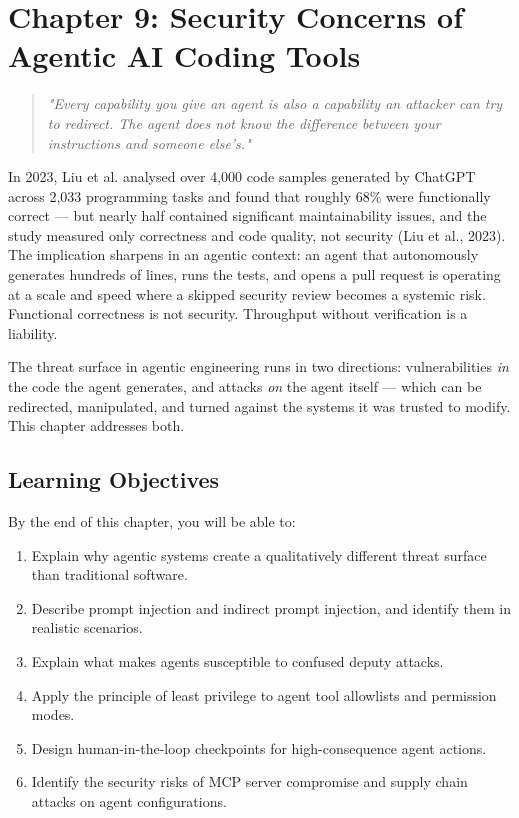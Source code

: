 \documentclass[11pt,a4paper]{book}
\begin{document}
\medskip


\chapter{Chapter 9: Security Concerns of Agentic AI Coding Tools}

\begin{quote}
\textit{\textit{"Every capability you give an agent is also a capability an attacker can try to redirect. The agent does not know the difference between your instructions and someone else's."}}
\end{quote}

\medskip

In 2023, Liu et al. analysed over 4,000 code samples generated by ChatGPT across 2,033 programming tasks and found that roughly 68\% were functionally correct --- but nearly half contained significant maintainability issues, and the study measured only correctness and code quality, not security (Liu et al., 2023). The implication sharpens in an agentic context: an agent that autonomously generates hundreds of lines, runs the tests, and opens a pull request is operating at a scale and speed where a skipped security review becomes a systemic risk. Functional correctness is not security. Throughput without verification is a liability.

The threat surface in agentic engineering runs in two directions: vulnerabilities \textit{in} the code the agent generates, and attacks \textit{on} the agent itself --- which can be redirected, manipulated, and turned against the systems it was trusted to modify. This chapter addresses both.

\medskip

\section{Learning Objectives}

By the end of this chapter, you will be able to:

\begin{enumerate}
  \item Explain why agentic systems create a qualitatively different threat surface than traditional software.
  \item Describe prompt injection and indirect prompt injection, and identify them in realistic scenarios.
  \item Explain what makes agents susceptible to confused deputy attacks.
  \item Apply the principle of least privilege to agent tool allowlists and permission modes.
  \item Design human-in-the-loop checkpoints for high-consequence agent actions.
  \item Identify the security risks of MCP server compromise and supply chain attacks on agent configurations.
\end{enumerate}
\end{document}
